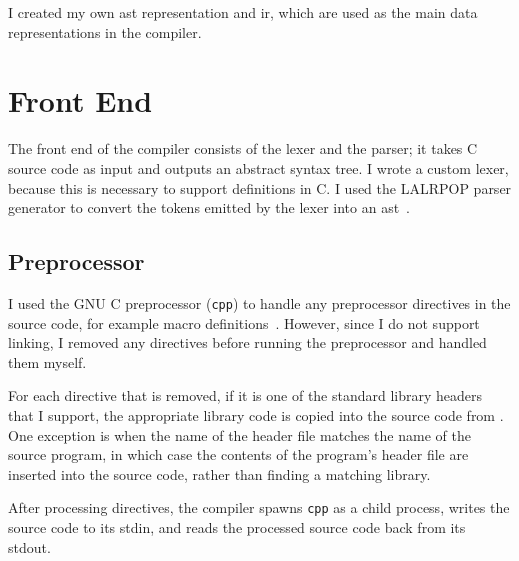 \documentclass[00-main.tex]{subfiles}
\begin{document}
I created my own \gls{ast} representation and \gls{ir}, which are used as the main data representations in the compiler.


\section{Front End}


The front end of the compiler consists of the lexer and the parser; it takes C source code as input and outputs an abstract syntax tree.
I wrote a custom lexer, because this is necessary to support  definitions in C\@.
I used the LALRPOP parser generator to convert the tokens emitted by the lexer into an \gls{ast}~.

\subsection{Preprocessor}

I used the GNU C preprocessor (\texttt{cpp}) to handle any preprocessor directives in the source code, for example macro definitions~.
However, since I do not support linking, I removed any  directives before running the preprocessor and handled them myself.

For each  directive that is removed, if it is one of the standard library headers that I support, the appropriate library code is copied into the source code from .
One exception is when the name of the header file matches the name of the source program, in which case the contents of the program's header file are inserted into the source code, rather than finding a matching library.

After processing  directives, the compiler spawns \texttt{cpp} as a child process, writes the source code to its stdin, and reads the processed source code back from its stdout.
\end{document}
